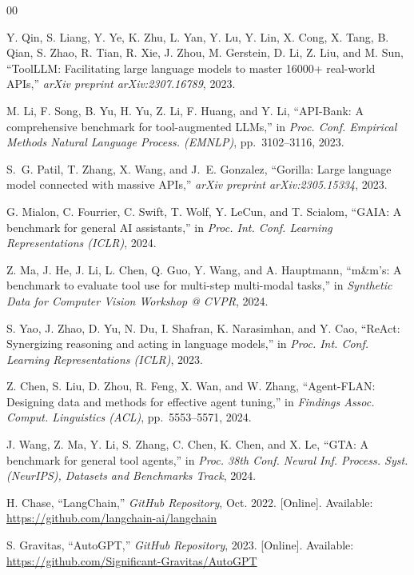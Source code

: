 \documentclass[conference]{IEEEtran}
\begin{document}
\begin{thebibliography}{00}

Y. Qin, S. Liang, Y. Ye, K. Zhu, L. Yan, Y. Lu, Y. Lin, X. Cong, X. Tang, B. Qian, S. Zhao, R. Tian, R. Xie, J. Zhou, M. Gerstein, D. Li, Z. Liu, and M. Sun, ``ToolLLM: Facilitating large language models to master 16000+ real-world APIs,'' \textit{arXiv preprint arXiv:2307.16789}, 2023.

M. Li, F. Song, B. Yu, H. Yu, Z. Li, F. Huang, and Y. Li, ``API-Bank: A comprehensive benchmark for tool-augmented LLMs,'' in \textit{Proc. Conf. Empirical Methods Natural Language Process. (EMNLP)}, pp.~3102--3116, 2023.

S.~G. Patil, T. Zhang, X. Wang, and J.~E. Gonzalez, ``Gorilla: Large language model connected with massive APIs,'' \textit{arXiv preprint arXiv:2305.15334}, 2023.

G. Mialon, C. Fourrier, C. Swift, T. Wolf, Y. LeCun, and T. Scialom, ``GAIA: A benchmark for general AI assistants,'' in \textit{Proc. Int. Conf. Learning Representations (ICLR)}, 2024.

Z. Ma, J. He, J. Li, L. Chen, Q. Guo, Y. Wang, and A. Hauptmann, ``m\&m's: A benchmark to evaluate tool use for multi-step multi-modal tasks,'' in \textit{Synthetic Data for Computer Vision Workshop @ CVPR}, 2024.

S. Yao, J. Zhao, D. Yu, N. Du, I. Shafran, K. Narasimhan, and Y. Cao, ``ReAct: Synergizing reasoning and acting in language models,'' in \textit{Proc. Int. Conf. Learning Representations (ICLR)}, 2023.

Z. Chen, S. Liu, D. Zhou, R. Feng, X. Wan, and W. Zhang, ``Agent-FLAN: Designing data and methods for effective agent tuning,'' in \textit{Findings Assoc. Comput. Linguistics (ACL)}, pp.~5553--5571, 2024.

J. Wang, Z. Ma, Y. Li, S. Zhang, C. Chen, K. Chen, and X. Le, ``GTA: A benchmark for general tool agents,'' in \textit{Proc. 38th Conf. Neural Inf. Process. Syst. (NeurIPS), Datasets and Benchmarks Track}, 2024.

H. Chase, ``LangChain,'' \textit{GitHub Repository}, Oct. 2022. [Online]. Available: \url{https://github.com/langchain-ai/langchain}

S. Gravitas, ``AutoGPT,'' \textit{GitHub Repository}, 2023. [Online]. Available: \url{https://github.com/Significant-Gravitas/AutoGPT}


\end{thebibliography}
\end{document}
